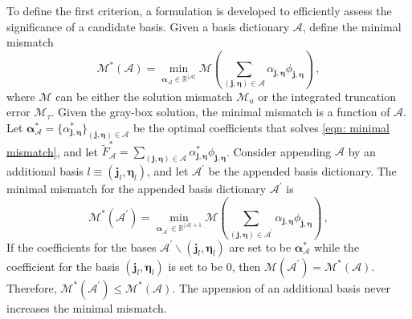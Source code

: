 To define the first criterion, 
a formulation is developed to efficiently assess the significance of a candidate basis.
Given a basis dictionary $\mathcal{A}$, define the minimal mismatch
\begin{equation}
    \mathcal{M}^*(\mathcal{A}) = \min_{\boldsymbol{\alpha}_\mathcal{A} \in \mathbb{R}^{|\mathcal{A}|}}
    \mathcal{M}\left( \sum_{(\boldsymbol{j}, \boldsymbol{\eta})\in \mathcal{A}}
    {\alpha}_{\boldsymbol{j}, \boldsymbol{\eta}} {\phi}_{\boldsymbol{j}, 
    \boldsymbol{\eta}} \right)\,,
    \label{eqn: minimal mismatch}
\end{equation}
where $\mathcal{M}$ can be either the solution mismatch $\mathcal{M}_u$ 
or the integrated truncation error $\mathcal{M}_{\tau}$.
Given the gray-box solution, the minimal mismatch 
is a function of $\mathcal{A}$.
Let $\boldsymbol{\alpha}_{\mathcal{A}}^* =\{\alpha_{\boldsymbol{j}, \boldsymbol{\eta}}^*\}_{
(\boldsymbol{j}, \boldsymbol{\eta})\in \mathcal{A}}$
be the optimal coefficients that solves \eqref{eqn: minimal mismatch}, and let
$\tilde{F}^*_\mathcal{A} = \sum_{(\boldsymbol{j}, \boldsymbol{\eta})\in \mathcal{A}} 
\alpha^*_{\boldsymbol{j}, \boldsymbol{\eta}} \phi_{\boldsymbol{j}, \boldsymbol{\eta}}$.
Consider appending $\mathcal{A}$ 
by an additional basis
$l\equiv \left(\boldsymbol{j}_l, \boldsymbol{\eta}_l\right)$, 
and let 
$\mathcal{A}^\prime$ be the appended basis dictionary.
The minimal mismatch for the appended basis dictionary
$\mathcal{A}^\prime$ is
\begin{equation}
    \mathcal{M}^*(\mathcal{A}^\prime) 
    = \min_{\boldsymbol{\alpha}_{\mathcal{A}^\prime} \in \mathbb{R}^{|\mathcal{A}|+1}}
    \mathcal{M}\left( \sum_{(\boldsymbol{j}, \boldsymbol{\eta})\in \mathcal{A}^\prime}
    {\alpha}_{\boldsymbol{j}, \boldsymbol{\eta}} {\phi}_{\boldsymbol{j}, \boldsymbol{\eta}} 
    \right)\,,
    \label{eqn: append minimal mismatch}
\end{equation}
If the coefficients for the bases $\mathcal{A}^\prime\backslash (\boldsymbol{j}_l, \boldsymbol{\eta}_l)$
are set to be $\boldsymbol{\alpha}^*_{\mathcal{A}}$ while the coefficient for the basis
$(\boldsymbol{j}_l, \boldsymbol{\eta}_l)$ is set to be $0$, then 
$\mathcal{M}(\mathcal{A}^\prime) = \mathcal{M}^*(\mathcal{A})$. 
Therefore, $\mathcal{M}^*(\mathcal{A}^\prime) \le \mathcal{M}^*(\mathcal{A})$. The appension of
an additional basis never increases the minimal mismatch.\\

